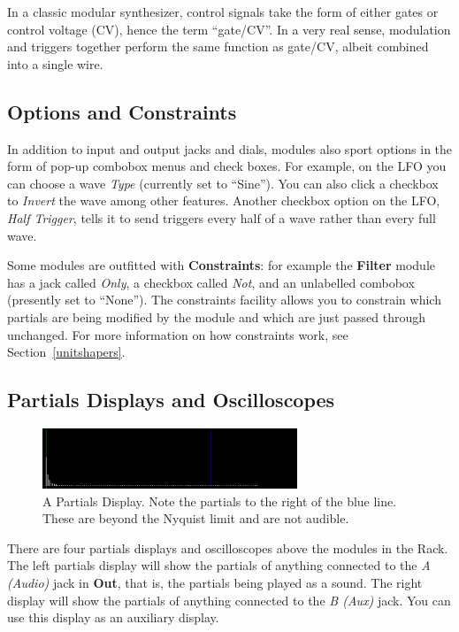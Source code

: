 \documentclass{article}
\begin{document}
In a classic modular synthesizer, control signals take the form of either gates or control voltage (CV), hence the term ``gate/CV''.  In a very real sense, modulation and triggers together perform the same function as gate/CV, albeit combined into a single wire.

\subsection{Options and Constraints}

In addition to input and output jacks and dials, modules also sport options in the form of pop-up combobox menus and check boxes.  For example, on the LFO you can choose a wave {\it Type} (currently set to ``Sine'').  You can also click a checkbox to {\it Invert} the wave among other features.  Another checkbox option on the LFO, {\it Half Trigger}, tells it to send triggers every half of a wave rather than every full wave.

Some modules are outfitted with {\bf Constraints}: for example the {\bf Filter} module has a jack called {\it Only}, a checkbox called {\it Not}, and an unlabelled combobox (presently set to ``None'').  The constraints facility allows you to constrain which partials are being modified by the module and which are just passed through unchanged.  For more information on how constraints work, see Section~\ref{unitshapers}.

\subsection{Partials Displays and Oscilloscopes}

\begin{figure}
\vspace{-1em}
\includegraphics[width=3in]{display}
\caption{A Partials Display.  Note the partials to the right of the blue line.  These are beyond the Nyquist limit and are not audible.}
\label{display}
\end{figure}

There are four partials displays and oscilloscopes above the modules in the Rack.  The left partials display will show the partials of anything connected to the {\it A (Audio)} jack in {\bf Out}, that is, the partials being played as a sound.  The right display will show the partials of anything connected to the {\it B (Aux)} jack.  You can use this display as an auxiliary display.
\end{document}
